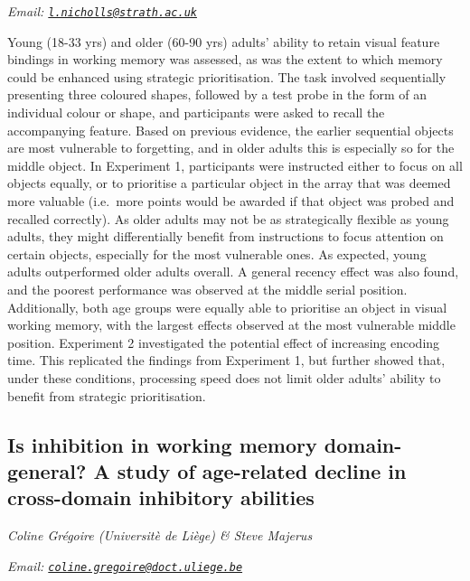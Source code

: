 \documentclass[12pt,]{book}
\begin{document}
\emph{Email: \href{mailto:l.nicholls@strath.ac.uk}{\nolinkurl{l.nicholls@strath.ac.uk}}}

Young (18-33 yrs) and older (60-90 yrs) adults' ability to retain visual feature bindings in working memory was assessed, as was the extent to which memory could be enhanced using strategic prioritisation. The task involved sequentially presenting three coloured shapes, followed by a test probe in the form of an individual colour or shape, and participants were asked to recall the accompanying feature. Based on previous evidence, the earlier sequential objects are most vulnerable to forgetting, and in older adults this is especially so for the middle object. In Experiment 1, participants were instructed either to focus on all objects equally, or to prioritise a particular object in the array that was deemed more valuable (i.e.~more points would be awarded if that object was probed and recalled correctly). As older adults may not be as strategically flexible as young adults, they might differentially benefit from instructions to focus attention on certain objects, especially for the most vulnerable ones. As expected, young adults outperformed older adults overall. A general recency effect was also found, and the poorest performance was observed at the middle serial position. Additionally, both age groups were equally able to prioritise an object in visual working memory, with the largest effects observed at the most vulnerable middle position. Experiment 2 investigated the potential effect of increasing encoding time. This replicated the findings from Experiment 1, but further showed that, under these conditions, processing speed does not limit older adults' ability to benefit from strategic prioritisation.

\hypertarget{is-inhibition-in-working-memory-domain-general-a-study-of-age-related-decline-in-cross-domain-inhibitory-abilities}{%
\subsection{Is inhibition in working memory domain-general? A study of age-related decline in cross-domain inhibitory abilities}\label{is-inhibition-in-working-memory-domain-general-a-study-of-age-related-decline-in-cross-domain-inhibitory-abilities}}

\emph{Coline Grégoire (Universitè de Liège) \& Steve Majerus}

\emph{Email: \href{mailto:coline.gregoire@doct.uliege.be}{\nolinkurl{coline.gregoire@doct.uliege.be}}}
\end{document}
